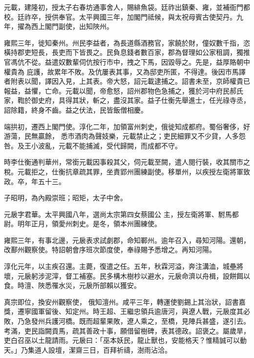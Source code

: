 \begin{pinyinscope}
 元載，建隆初，授太子右春坊通事舍人，賜緋魚袋。廷祚出鎮秦、雍，並補衙門都校。廷祚卒，授供奉官。太平興國三年，加閣門祗候，與太祝母賓古使契丹。九年，擢為西上閣門副使，出知陜州。



 雍熙三年，徙知秦州。州民李益者，為長道縣酒務官，家饒於財，僮奴數千指，恣橫持郡吏短長，長吏而下皆畏之。民負息錢者數百家，郡為督理如公家租調，獨推官馮伉不從。益遣奴數輩伺伉按行市中，拽之下馬，因毀辱之。先是，益厚賂朝中權貴為
 庇護，故累年不敗。及伉屢表其事，又為邸吏所匿，不得達。後因市馬譯者附表以聞，譯因入見，上其表。帝大怒，詔元載逮捕之。詔書未至，京師權貴已報益，益懼，亡命。元載以聞，帝愈怒，詔州郡物色急捕之，獲於河中府民郝氏家，鞫於御史府，具得其狀，斬之，盡沒其家。益子仕衡先舉進士，任光祿寺丞，詔除籍，終身不齒。益之伏法，民皆飯僧相慶。



 端拱初，遷西上閣門使。淳化二年，加領富州刺史，俄徙知成都府。蜀俗奢侈，好游蕩，民無贏餘，
 悉市酒肉為聲妓樂，元載禁止之；吏民細罪又不少貸，人多怨咎。及王小波亂，元載不能捕滅，受代歸闕，而成都不守。



 時李仕衡通判華州，常銜元載因事殺其父，伺元載至闕，遣人閱行裝，收其關市之稅。元載拒之，仕衡抗章疏其罪，坐責郢州團練副使。移單州，以疾授左衛將軍致政。卒，年五十三。



 子昭明，為內殿崇班；昭矩，太子中舍。



 元扆字君華。太平興國八年，選尚太宗第四女蔡國公
 主，授左衛將軍、駙馬都尉。明年正月，領愛州刺史。是冬，領本州團練使。



 雍熙三年，有事北邊，元扆表求試劇郡，命知鄆州。逾年召入，尋知河陽。還朝，改鄯州觀察使。特詔朝會序班次節度使，奉祿賜予悉增之。再知河陽。



 淳化元年，以主疾召還。主薨，復遣之任。五年，秋霖河溢，奔注溝洫，城壘將壞，元扆躬涉泥滓，督工補塞。民多構木樹杪以避水，元扆命濟以舟楫，設餅餌以食。時澶、陜悉罹水災，元扆所部賴以獲安。



 真宗即位，換安州觀察使，
 俄知澶州。咸平三年，轉運使劉錫上其治狀，詔書嘉獎，遷寧國軍留後、知定州。時王超、王繼忠領兵逾唐河，與遼人戰，元扆度其必敗，乃急發州兵護河橋。既而超輩果敗，遼人乘之，至橋，見陣兵甚盛，遂引去。考滿，吏民詣闕貢馬，疏其善政十事，願借留樹碑，表其德政。詔褒之。屬歲旱，吏白召巫以土龍請雨。元扆曰：「巫本妖民，龍止獸也，安能格天？惟精誠可以動天。」乃集道人設壇，潔齋三日，百拜祈禱，澍雨沾洽。




\end{pinyinscope}
